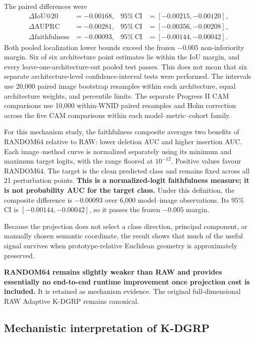The paired differences were
\begin{align}
    \Delta\mathrm{IoU@20}
        &=-0.00168,
        &95\%\ \mathrm{CI}&=[-0.00215,-0.00120],\\
    \Delta\mathrm{AUPRC}
        &=-0.00281,
        &95\%\ \mathrm{CI}&=[-0.00356,-0.00208],\\
    \Delta\mathrm{faithfulness}
        &=-0.00093,
        &95\%\ \mathrm{CI}&=[-0.00144,-0.00042].
\end{align}
Both pooled localization lower bounds exceed the frozen $-0.005$
non-inferiority margin. Six of six architecture point estimates lie within the
IoU margin, and every leave-one-architecture-out pooled test passes. This does
not mean that six separate architecture-level confidence-interval tests were
performed. The intervals use 20,000 paired image bootstrap resamples within
each architecture, equal architecture weights, and percentile limits. The
separate Progress II CAM comparisons use 10,000 within-WNID paired resamples
and Holm correction across the five CAM comparisons within each
model--metric--cohort family.

For this mechanism study, the faithfulness composite averages two benefits of
RANDOM64 relative to RAW: lower deletion AUC and higher insertion AUC. Each
image--method curve is normalized separately using its minimum and maximum
target logits, with the range floored at $10^{-12}$. Positive values favour
RANDOM64. The target is the clean predicted class and remains fixed across all
21 perturbation points. \textbf{This is a normalized-logit faithfulness
measure; it is not probability AUC for the target class.} Under this definition,
the composite difference is $-0.00093$ over 6,000 model--image observations.
Its 95\% CI is $[-0.00144,-0.00042]$, so it passes the frozen $-0.005$ margin.

Because the projection does not select a class direction, principal component,
or manually chosen semantic coordinate, the result shows that much of the
useful signal survives when prototype-relative Euclidean geometry is
approximately preserved.

\textbf{RANDOM64 remains slightly weaker than RAW and provides essentially no
end-to-end runtime improvement once projection cost is included.} It is retained
as mechanism evidence. The original full-dimensional RAW Adaptive K-DGRP
remains canonical.

\subsection{Mechanistic interpretation of K-DGRP}


